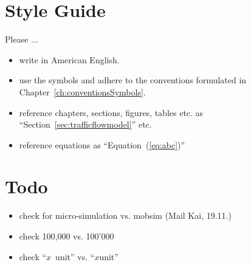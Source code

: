 



\section*{Style Guide}
\label{sec:styleguide}

Please ...

\begin{itemize}

\item write in American English.

\item use the symbols and adhere to the conventions formulated in Chapter~\ref{ch:conventionsSymbols}.

\item reference chapters, sections, figures, tables etc. as ``Section~\ref{sec:trafficflowmodel}'' etc.

\item reference equations as ``Equation~(\ref{eq:abc})''

\end{itemize}

\vfill\eject

\section*{Todo}

\begin{itemize}

\item check for micro-simulation vs. mobsim (Mail Kai, 19.11.)

\item check 100,000 vs. 100'000

\item check "`$x$\ unit"' vs. "`$x$unit"'

\end{itemize}

\vfill\eject

\lstset{language=Java}


